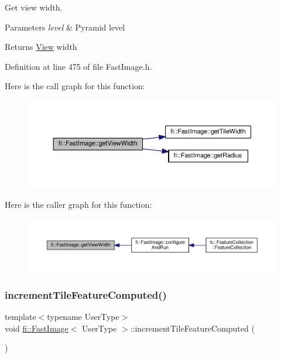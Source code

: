 Get view width. 


\begin{DoxyParams}{Parameters}
{\em level} & Pyramid level \\
\hline
\end{DoxyParams}
\begin{DoxyReturn}{Returns}
\hyperlink{classfi_1_1View}{View} width 
\end{DoxyReturn}


Definition at line 475 of file Fast\+Image.\+h.

Here is the call graph for this function\+:
\nopagebreak
\begin{figure}[H]
\begin{center}
\leavevmode
\includegraphics[width=350pt]{dc/d6b/classfi_1_1FastImage_a21092b9c0fe86ea190291fc79901dc93_cgraph}
\end{center}
\end{figure}
Here is the caller graph for this function\+:
\nopagebreak
\begin{figure}[H]
\begin{center}
\leavevmode
\includegraphics[width=350pt]{dc/d6b/classfi_1_1FastImage_a21092b9c0fe86ea190291fc79901dc93_icgraph}
\end{center}
\end{figure}
\mbox{\label{classfi_1_1FastImage_a9778dab9f8a9ec5c834a00a9410f474a}} 
\subsubsection{\texorpdfstring{increment\+Tile\+Feature\+Computed()}{incrementTileFeatureComputed()}}
{\footnotesize\ttfamily template$<$typename User\+Type$>$ \\
void \hyperlink{classfi_1_1FastImage}{fi\+::\+Fast\+Image}$<$ User\+Type $>$\+::increment\+Tile\+Feature\+Computed (\begin{DoxyParamCaption}{ }\end{DoxyParamCaption})\hspace{0.3cm}{\ttfamily [inline]}}



